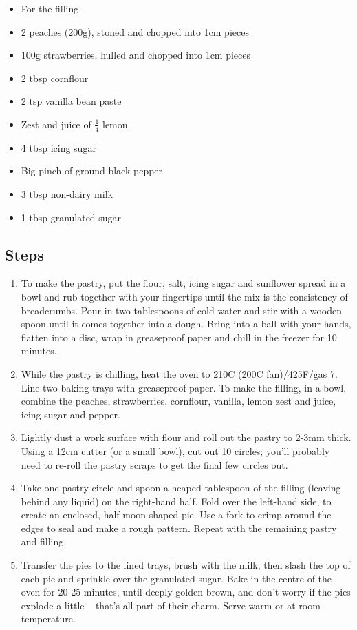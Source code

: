 \documentclass{book}
\begin{document}
\begin{itemize}
\item For the filling
\item 2 peaches (200g), stoned and chopped into 1cm pieces
\item 100g strawberries, hulled and chopped into 1cm pieces
\item 2 tbsp cornflour 
\item 2 tsp vanilla bean paste 
\item Zest and juice of $\frac{1}{4}$ lemon
\item 4 tbsp icing sugar 
\item Big pinch of ground black pepper 
\item 3 tbsp non-dairy milk
\item 1 tbsp granulated sugar
\end{itemize}

\subsection*{Steps}
\begin{enumerate}
\item To make the pastry, put the flour, salt, icing sugar and sunflower spread in a bowl and rub together with your fingertips until the mix is the consistency of breadcrumbs. Pour in two tablespoons of cold water and stir with a wooden spoon until it comes together into a dough. Bring into a ball with your hands, flatten into a disc, wrap in greaseproof paper and chill in the freezer for 10 minutes.
\item While the pastry is chilling, heat the oven to 210C (200C fan)/425F/gas 7. Line two baking trays with greaseproof paper. To make the filling, in a bowl, combine the peaches, strawberries, cornflour, vanilla, lemon zest and juice, icing sugar and pepper.
\item Lightly dust a work surface with flour and roll out the pastry to 2-3mm thick. Using a 12cm cutter (or a small bowl), cut out 10 circles; you’ll probably need to re-roll the pastry scraps to get the final few circles out.
\item Take one pastry circle and spoon a heaped tablespoon of the filling (leaving behind any liquid) on the right-hand half. Fold over the left-hand side, to create an enclosed, half-moon-shaped pie. Use a fork to crimp around the edges to seal and make a rough pattern. Repeat with the remaining pastry and filling.
\item Transfer the pies to the lined trays, brush with the milk, then slash the top of each pie and sprinkle over the granulated sugar. Bake in the centre of the oven for 20-25 minutes, until deeply golden brown, and don’t worry if the pies explode a little – that’s all part of their charm. Serve warm or at room temperature.
\end{enumerate}
\newpage
\end{document}
